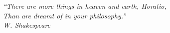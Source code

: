 \thispagestyle{empty}
\begin{flushright}
\itshape ``There are more things in heaven and earth, Horatio, \\ Than are dreamt of in your philosophy.''\\W. Shakespeare
\end{flushright}
\clearpage

\thispagestyle{plain}